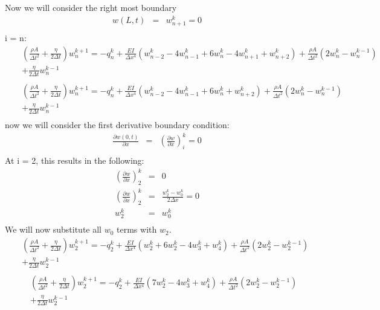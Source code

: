 \documentclass[a4paper]{article}
\begin{document}
Now we will consider the right most boundary
\begin{eqnarray*}
w(L,t) & = & w^{k}_{n+1}= 0\\
\end{eqnarray*}
i = n:
\begin{eqnarray*}
& & (\frac{\rho A}{\Delta t^{2}}+\frac{\eta}{2\Delta t})w^{k+1}_{n} = -q^{k}_{n} + \frac{EI}{\Delta x^{4}}(w^{k}_{n-2}-4w^{k}_{n-1}+6w^{k}_{n}-4w^{k}_{n+1}+w^{k}_{n+2}) + \frac{\rho A}{\Delta t^{2}}(2w^{k}_{n}-w^{k-1}_{n})\\
& & + \frac{\eta}{2\Delta t}w^{k-1}_{n}\\
\end{eqnarray*}
\begin{eqnarray*}
& & (\frac{\rho A}{\Delta t^{2}}+\frac{\eta}{2\Delta t})w^{k+1}_{n} = -q^{k}_{n} + \frac{EI}{\Delta x^{4}}(w^{k}_{n-2}-4w^{k}_{n-1}+6w^{k}_{n}+w^{k}_{n+2}) + \frac{\rho A}{\Delta t^{2}}(2w^{k}_{n}-w^{k-1}_{n})\\
& & + \frac{\eta}{2\Delta t}w^{k-1}_{n}\\
\end{eqnarray*}
now we will consider the first derivative boundary condition:
\begin{eqnarray*}
\frac{\partial w(0,t)}{\partial x} & = & (\frac{\partial w}{\partial x})^{k}_{i} = 0\\
\end{eqnarray*}
At i = 2, this results in the following:
\begin{eqnarray*}
(\frac{\partial w}{\partial x})^{k}_{2} & = & 0\\
(\frac{\partial w}{\partial x})^{k}_{2} & = & \frac{w^{k}_{2}-w^{k}_{0}}{2\Delta x} = 0\\
w^{k}_{2} & = & w^{k}_{0}\\
\end{eqnarray*}
We will now substitute all $w_{0}$ terms with $w_{2}$.
\begin{eqnarray*}
& & (\frac{\rho A}{\Delta t^{2}}+\frac{\eta}{2\Delta t})w^{k+1}_{2} = -q^{k}_{2} + \frac{EI}{\Delta x^{4}}(w^{k}_{2}+6w^{k}_{2}-4w^{k}_{3}+w^{k}_{4}) + \frac{\rho A}{\Delta t^{2}}(2w^{k}_{2}-w^{k-1}_{2})\\
& & + \frac{\eta}{2\Delta t}w^{k-1}_{2}\\
\end{eqnarray*}
\begin{eqnarray*}
& & (\frac{\rho A}{\Delta t^{2}}+\frac{\eta}{2\Delta t})w^{k+1}_{2} = -q^{k}_{2} + \frac{EI}{\Delta x^{4}}(7w^{k}_{2}-4w^{k}_{3}+w^{k}_{4}) + \frac{\rho A}{\Delta t^{2}}(2w^{k}_{2}-w^{k-1}_{2})\\
& & + \frac{\eta}{2\Delta t}w^{k-1}_{2}\\
\end{eqnarray*}
\end{document}
